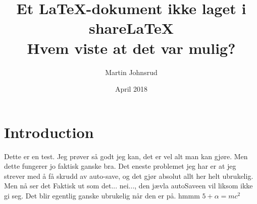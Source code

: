 \documentclass{article}
\author{Martin Johnsrud}
\title{Et \LaTeX-dokument ikke laget i share\LaTeX \\ \small{Hvem viste at det var mulig?}}
\date{April 2018}
\begin{document}
\vspace{-6cm}
\maketitle

\section{Introduction}
Dette er en test. Jeg prøver så godt jeg kan, det er vel alt man kan gjøre. Men dette
fungerer jo faktisk ganske bra. Det eneste problemet jeg har er at jeg strever med
å få skrudd av auto-save, og det gjør absolut allt her helt ubrukelig. Men nå ser det
Faktisk ut som det... nei..., den jævla autoSaveen vil liksom ikke gi seg. Det blir egentlig ganske ubrukelig når den er på. hmmm 
\(5 + \alpha = mc^2\)
\end{document}
